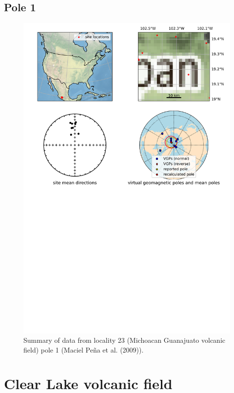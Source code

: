 \subsection{Pole 1}


\begin{figure}[H]
\centering
\includegraphics[width=5 in]{./23/1/pole_summary.png}
\caption{Summary of data from locality 23 (Michoacan Guanajuato volcanic field) pole 1 (Maciel Peña et al. (2009)).}
\end{figure}

\section{Clear Lake volcanic field}
